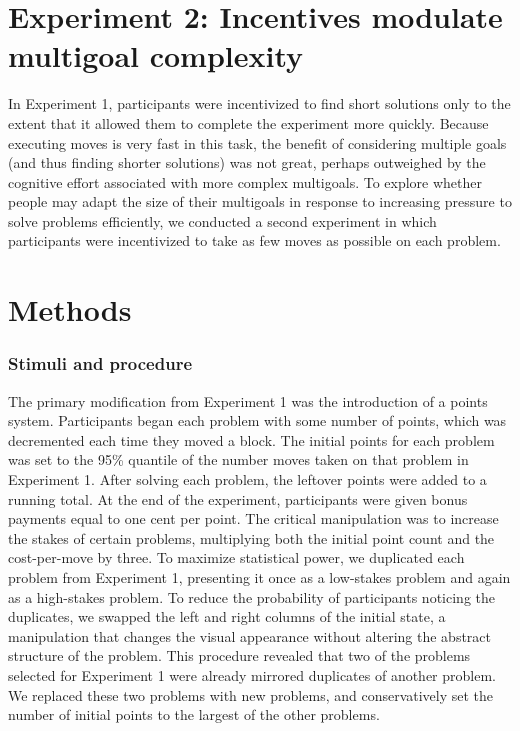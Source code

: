 \documentclass[10pt,letterpaper]{article}
\begin{document}



\section{Experiment 2: Incentives modulate multigoal complexity}
In Experiment 1, participants were incentivized to find short solutions only to the extent that it allowed them to complete the experiment more quickly. Because executing moves is very fast in this task, the benefit of considering multiple goals (and thus finding shorter solutions) was not great, perhaps outweighed by the cognitive effort associated with more complex multigoals. To explore whether people may adapt the size of their multigoals in response to increasing pressure to solve problems efficiently, we conducted a second experiment in which participants were incentivized to take as few moves as possible on each problem.

\section{Methods}
\subsubsection{Stimuli and procedure}
The primary modification from Experiment 1 was the introduction of a points system. Participants began each problem with some number of points, which was decremented each time they moved a block. The initial points for each problem was set to the 95\% quantile of the number moves taken on that problem in Experiment 1. After solving each problem, the leftover points were added to a running total. At the end of the experiment, participants were given bonus payments equal to one cent per point. The critical manipulation was to increase the stakes of certain problems, multiplying both the initial point count and the cost-per-move by three. To maximize statistical power, we duplicated each problem from Experiment 1, presenting it once as a low-stakes problem and again as a high-stakes problem. To reduce the probability of participants noticing the duplicates, we swapped the left and right columns of the initial state, a manipulation that changes the visual appearance without altering the abstract structure of the problem. This procedure revealed that two of the problems selected for Experiment 1 were already mirrored duplicates of another problem. We replaced these two problems with new problems, and conservatively set the number of initial points to the largest of the other problems.
\end{document}
